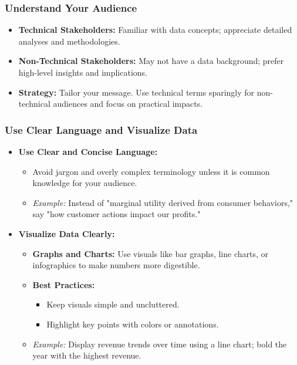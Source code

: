 \documentclass{beamer}
\begin{document}
\begin{frame}[fragile]
    \frametitle{Understand Your Audience}
    \begin{itemize}
        \item \textbf{Technical Stakeholders:} Familiar with data concepts; appreciate detailed analyses and methodologies.
        \item \textbf{Non-Technical Stakeholders:} May not have a data background; prefer high-level insights and implications.
        \item \textbf{Strategy:} Tailor your message. Use technical terms sparingly for non-technical audiences and focus on practical impacts.
    \end{itemize}
\end{frame}

\begin{frame}[fragile]
    \frametitle{Use Clear Language and Visualize Data}
    \begin{itemize}
        \item \textbf{Use Clear and Concise Language:}
            \begin{itemize}
                \item Avoid jargon and overly complex terminology unless it is common knowledge for your audience.
                \item \textit{Example:} Instead of "marginal utility derived from consumer behaviors," say "how customer actions impact our profits."
            \end{itemize}

        \item \textbf{Visualize Data Clearly:}
            \begin{itemize}
                \item \textbf{Graphs and Charts:} Use visuals like bar graphs, line charts, or infographics to make numbers more digestible.
                \item \textbf{Best Practices:} 
                    \begin{itemize}
                        \item Keep visuals simple and uncluttered.
                        \item Highlight key points with colors or annotations.
                    \end{itemize}
                \item \textit{Example:} Display revenue trends over time using a line chart; bold the year with the highest revenue.
            \end{itemize}
    \end{itemize}
\end{frame}
\end{document}

